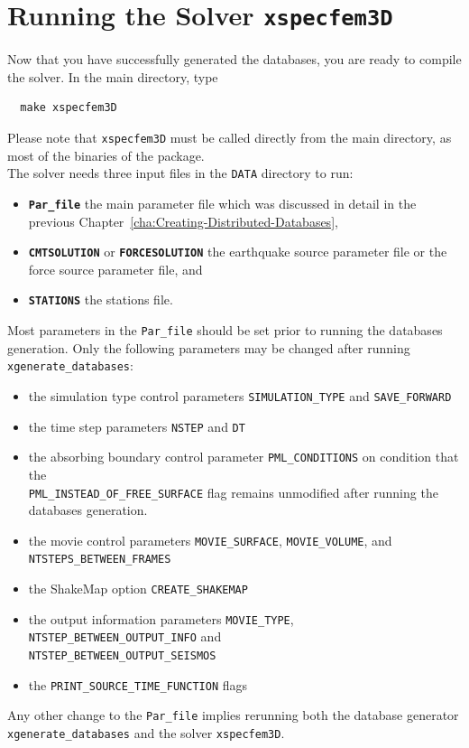 \chapter{Running the Solver \texttt{xspecfem3D}}\label{cha:Running-the-Solver}

Now that you have successfully generated the databases, you are ready
to compile the solver. In the main directory, type
{\small
\begin{verbatim}
  make xspecfem3D
\end{verbatim}
}
\noindent
Please note that \texttt{xspecfem3D} must be called directly from
the main directory, as most of the binaries of the package.\\

\noindent
The solver needs three input files in the \texttt{DATA} directory
to run:
\begin{itemize}
\item {\bf \texttt{Par\_file}} the main parameter file which was discussed
in detail in the previous Chapter~\ref{cha:Creating-Distributed-Databases},
\item {\bf \texttt{CMTSOLUTION}} or {\bf \texttt{FORCESOLUTION}} the earthquake
source parameter file or the force source parameter file, and
\item {\bf \texttt{STATIONS}} the stations file.
\end{itemize}

\noindent
Most parameters in the \texttt{Par\_file} should be set prior to running
the databases generation. Only the following parameters may be changed
after running \texttt{xgenerate\_databases}:
\begin{itemize}
\item the simulation type control parameters \texttt{SIMULATION\_TYPE}
and \texttt{SAVE\_FORWARD}
\item the time step parameters \texttt{NSTEP} and \texttt{DT}
\item the absorbing boundary control parameter \texttt{PML\_CONDITIONS}
on condition that the\\
 \texttt{PML\_INSTEAD\_OF\_FREE\_SURFACE} flag remains unmodified
after running the databases generation.
\item the movie control parameters \texttt{MOVIE\_SURFACE}, \texttt{MOVIE\_VOLUME},
and \texttt{NTSTEPS\_BETWEEN\_FRAMES}
\item the ShakeMap\textregistered{} option \texttt{CREATE\_SHAKEMAP}
\item the output information parameters \texttt{MOVIE\_TYPE}, \texttt{NTSTEP\_BETWEEN\_OUTPUT\_INFO} and\\
\texttt{NTSTEP\_BETWEEN\_OUTPUT\_SEISMOS}
\item the \texttt{PRINT\_SOURCE\_TIME\_FUNCTION} flags
\end{itemize}
Any other change to the \texttt{Par\_file} implies rerunning both
the database generator \texttt{xgenerate\_databases} and the solver
\texttt{xspecfem3D}.\\


